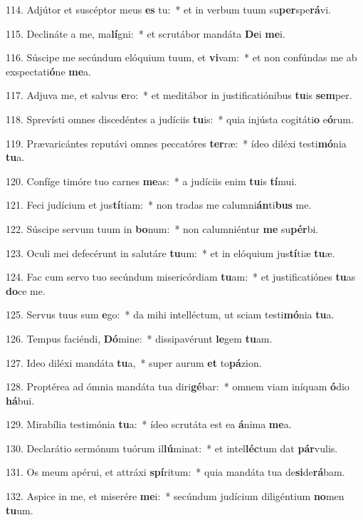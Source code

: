 114. Adjútor et suscéptor meus \textbf{es} tu:~*  et in verbum tuum su\textbf{per}spe\textbf{rá}vi.\

115. Declináte a me, ma\textbf{lí}gni:~*  et scrutábor mandáta \textbf{De}i \textbf{me}i.\

116. Súscipe me secúndum elóquium tuum, et \textbf{vi}vam:~*  et non confúndas me ab exspectati\textbf{ó}ne \textbf{me}a.\

117. Adjuva me, et salvus \textbf{e}ro:~*  et meditábor in justificatiónibus \textbf{tu}is \textbf{sem}per.\

118. Sprevísti omnes discedéntes a judíciis \textbf{tu}is:~*  quia injústa cogitáti\textbf{o} e\textbf{ó}rum.\

119. Prævaricántes reputávi omnes peccatóres \textbf{ter}ræ:~*  ídeo diléxi testi\textbf{mó}nia \textbf{tu}a.\

120. Confíge timóre tuo carnes \textbf{me}as:~*  a judíciis enim \textbf{tu}is \textbf{tí}mui.\

121. Feci judícium et jus\textbf{tí}tiam:~*  non tradas me calumni\textbf{án}ti\textbf{bus} me.\

122. Súscipe servum tuum in \textbf{bo}num:~*  non calumniéntur \textbf{me} su\textbf{pér}bi.\

123. Oculi mei defecérunt in salutáre \textbf{tu}um:~*  et in elóquium jus\textbf{tí}tiæ \textbf{tu}æ.\

124. Fac cum servo tuo secúndum misericórdiam \textbf{tu}am:~*  et justificatiónes \textbf{tu}as \textbf{do}ce me.\

125. Servus tuus sum \textbf{e}go:~*  da mihi intelléctum, ut sciam testi\textbf{mó}nia \textbf{tu}a.\

126. Tempus faciéndi, \textbf{Dó}mine:~*  dissipavérunt \textbf{le}gem \textbf{tu}am.\

127. Ideo diléxi mandáta \textbf{tu}a,~*  super aurum \textbf{et} to\textbf{pá}zion.\

128. Proptérea ad ómnia mandáta tua diri\textbf{gé}bar:~*  omnem viam iníquam \textbf{ó}dio \textbf{há}bui.\

129. Mirabília testimónia \textbf{tu}a:~*  ídeo scrutáta est ea \textbf{á}nima \textbf{me}a.\

130. Declarátio sermónum tuórum il\textbf{lú}minat:~*  et intel\textbf{léc}tum dat \textbf{pár}vulis.\

131. Os meum apérui, et attráxi \textbf{spí}ritum:~*  quia mandáta tua de\textbf{si}de\textbf{rá}bam.\

132. Aspice in me, et miserére \textbf{me}i:~*  secúndum judícium diligéntium \textbf{no}men \textbf{tu}um.\

